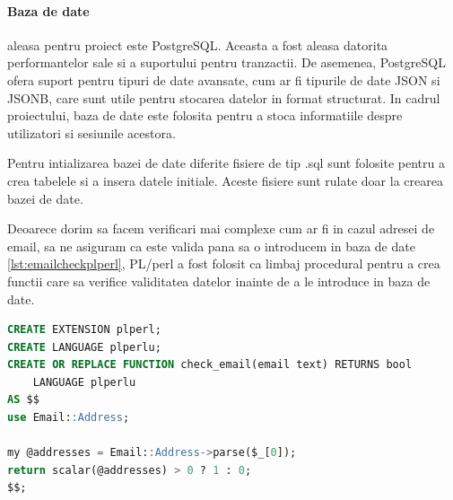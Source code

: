 \documentclass[titlepage,12pt]{article}
\DeclareRobustCommand{\code}[1]{{\ttfamily\small #1}}
\begin{document}
\paragraph{Baza de date} aleasa pentru proiect este \code{PostgreSQL}. Aceasta a fost aleasa datorita performantelor sale si a suportului pentru tranzactii. De asemenea, PostgreSQL ofera suport pentru tipuri de date avansate, cum ar fi tipurile de date JSON si JSONB, care sunt utile pentru stocarea datelor in format structurat. In cadrul proiectului, baza de date este folosita pentru a stoca informatiile despre utilizatori si sesiunile acestora.

Pentru intializarea bazei de date diferite fisiere de tip \code{.sql} sunt folosite pentru a crea tabelele si a insera datele initiale. Aceste fisiere sunt rulate doar la crearea bazei de date.

Deoarece dorim sa facem verificari mai complexe cum ar fi in cazul adresei de email, sa ne asiguram ca este valida pana sa o introducem in baza de date \cref{lst:emailcheckplperl}, \code{PL/perl} a fost folosit ca limbaj procedural pentru a crea functii care sa verifice validitatea datelor inainte de a le introduce in baza de date.

\begin{lstlisting}[language=SQL,caption={Functia PL/perl pentru verificarea adresei de email},label={lst:emailcheckplperl}]
CREATE EXTENSION plperl;
CREATE LANGUAGE plperlu;
CREATE OR REPLACE FUNCTION check_email(email text) RETURNS bool
    LANGUAGE plperlu
AS $$
use Email::Address;

my @addresses = Email::Address->parse($_[0]);
return scalar(@addresses) > 0 ? 1 : 0;
$$;
\end{lstlisting}
\end{document}
